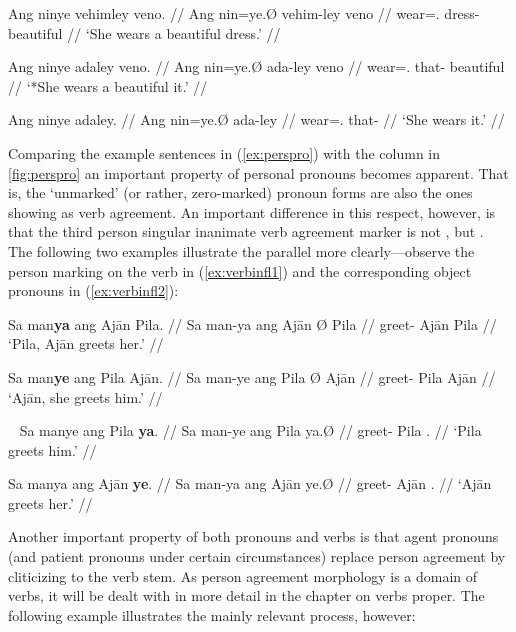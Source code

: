 \pex\label{ex:procompldist}
\a\begingl
	\gla Ang ninye vehimley veno. //
	\glb Ang nin=ye.Ø vehim-ley veno //
	\glc \Aarg{} wear=\TsgF{}.\Top{} dress-\PargI{} beautiful //
	\glft `She wears a beautiful dress.' //
\endgl

\a\ljudge* \begingl
	\gla Ang ninye adaley veno. //
	\glb Ang nin=ye.Ø ada-ley veno //
	\glc \Aarg{} wear=\TsgF{}.\Top{} that-\PargI{} beautiful //
	\glft `*She wears a beautiful it.' //
\endgl

\a\begingl
	\gla Ang ninye adaley. //
	\glb Ang nin=ye.Ø ada-ley //
	\glc \Aarg{} wear=\TsgF{}.\Top{} that-\PargI{} //
	\glft `She wears it.' //
\endgl

\xe

Comparing the example sentences in (\ref{ex:perspro}) with the \Top{} column in 
\autoref{fig:perspro} an important property of personal pronouns becomes 
apparent. That is, the `unmarked' (or rather, zero-marked) pronoun forms are 
also the ones showing as verb agreement. An important difference in this 
respect, however, is that the third person singular inanimate verb agreement 
marker is not , but . The following two examples 
illustrate the parallel more clearly---observe the person marking on the verb 
in (\ref{ex:verbinfl1}) and the corresponding object pronouns in 
(\ref{ex:verbinfl2}):

\pex\label{ex:verbinfl1}
\a\begingl
	\gla Sa man\textbf{ya} ang Ajān {} Pila. //
	\glb Sa man-ya ang ​Ajān Ø ​Pila //
	\glc \PatT{} greet-\TsgM{} \Aarg{} ​Ajān \Top{} ​Pila //
	\glft `Pila, Ajān greets her.' //
\endgl

\a\begingl
	\gla Sa man\textbf{ye} ang Pila {} Ajān. //
	\glb Sa man-ye ang Pila Ø ​Ajān //
	\glc \PatT{} greet-\TsgF{} \Aarg{} Pila \Top{} ​Ajān //
	\glft `Ajān, she greets him.' //
\endgl

\xe

\pex~\label{ex:verbinfl2}
\a\begingl
	\gla Sa manye ang Pila \textbf{ya}. //
	\glb Sa man-ye ang Pila ya.Ø //
	\glc \PatT{} greet-\TsgF{} \Aarg{} Pila \TsgM{}.\Top{} //
	\glft `Pila greets him.' //
\endgl

\a\begingl
	\gla Sa manya ang Ajān \textbf{ye}. //
	\glb Sa man-ya ang ​Ajān ye.Ø //
	\glc \PatT{} greet-\TsgM{} \Aarg{} ​Ajān \TsgF{}.\Top{} //
	\glft `Ajān greets her.' //
\endgl

\xe

Another important property of both pronouns and verbs is that agent pronouns 
(and patient pronouns under certain circumstances) replace person agreement by 
cliticizing to the verb stem. As person agreement morphology is a domain of 
verbs, it will be dealt with in more detail in the chapter on verbs proper. The 
following example illustrates the mainly relevant process, however:

